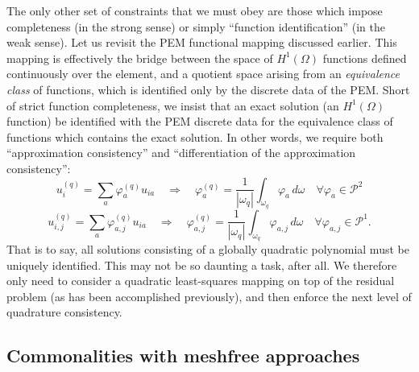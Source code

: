 \documentclass[11pt]{article} %
\begin{document}
The only other set of constraints that we must obey are those which impose completeness (in the strong sense) or simply ``function identification'' (in the weak sense). Let us revisit the PEM functional mapping discussed earlier. This mapping is effectively the bridge between the space of $H^1 (\Omega)$ functions defined continuously over the element, and a quotient space arising from an \textit{equivalence class} of functions, which is identified only by the discrete data of the PEM. Short of strict function completeness, we insist that an exact solution (an $H^1 (\Omega)$ function) be identified with the PEM discrete data for the equivalence class of functions which contains the exact solution. In other words, we require both ``approximation consistency'' and ``differentiation of the approximation consistency'':
\begin{equation}
	u_i^{(q)} = \sum_a \varphi^{(q)}_a u_{ia} \quad \Rightarrow \quad \varphi^{(q)}_a = \frac{1}{| \omega_q |} \int_{\omega_q} \varphi_a \, d \omega \quad \forall \varphi_a \in \mathcal{P}^2
\end{equation}
\begin{equation}
	u_{i,j}^{(q)} = \sum_a \varphi^{(q)}_{a,j} u_{ia} \quad \Rightarrow \quad \varphi^{(q)}_{a,j} = \frac{1}{| \omega_q |} \int_{\omega_q} \varphi_{a,j} \, d \omega \quad \forall \varphi_{a,j} \in \mathcal{P}^1.
\end{equation}
That is to say, all solutions consisting of a globally quadratic polynomial must be uniquely identified. This may not be so daunting a task, after all. We therefore only need to consider a quadratic least-squares mapping on top of the residual problem (as has been accomplished previously), and then enforce the next level of quadrature consistency.

\subsection{Commonalities with meshfree approaches}
\end{document}
